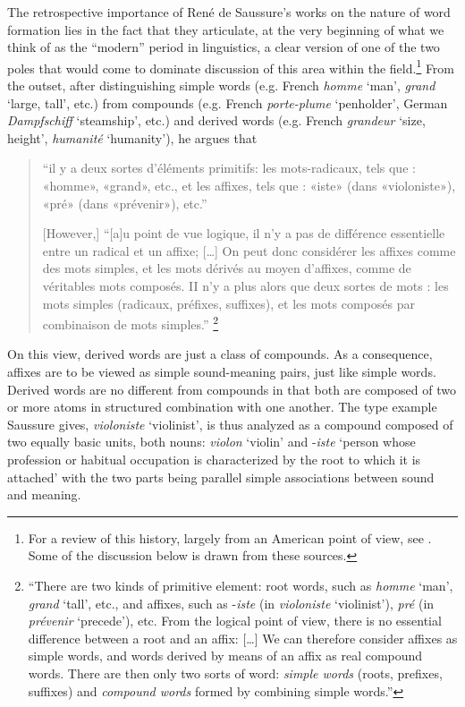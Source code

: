 \documentclass[output=paper]{langsci/langscibook}
\begin{document}
The retrospective importance of Ren\'e de Saussure's works on the
nature of word formation lies in the fact that they articulate, at the
very beginning of what we think of as the ``modern'' period in
linguistics, a clear version of one of the two poles that would come
to dominate discussion of this area within the field.\footnote{For a
  review of this history, largely from an American point of view, see
  \citet{anderson17:matthews,anderson17:ohmt}. Some of the discussion
  below is drawn from these sources.}  From the outset, after
distinguishing simple words (e.g. French \emph{homme} `man',
\emph{grand} `large, tall', etc.)  from compounds (e.g. French
\emph{porte-plume} `penholder', German \emph{Dampfschiff} `steamship',
etc.) and derived words (e.g. French \emph{grandeur} `size, height',
\emph{humanit\'e} `humanity'), he argues that
\begin{quotation}
  ``il y a deux sortes d'\'el\'ements primitifs: les mots-radicaux,
  tels que : «hom\-me», «grand», etc., et les affixes, tels que : «iste»
  (dans «violoniste»), «pr\'e» (dans «pr\'evenir»), etc.''

  {[However,]} ``[a]u point de vue logique, il n’y a pas de
  diff\'erence essentielle entre un radical et un affixe; {[\ldots]}
  On peut donc consid\'erer les affixes comme des mots simples, et les
  mots d\'eriv\'es au moyen d’affixes, comme de v\'eritables mots
  compos\'es. II n’y a plus alors que deux sortes de mots : les mots
  simples (radicaux, pr\'efixes, suffixes), et les mots compos\'es par
  combinaison de mots simples.''
  \footnote{``There are two
    kinds of primitive element: root words, such as \emph{homme}
    ‘man’, \emph{grand} ‘tall’, etc., and affixes, such as
    -\emph{iste} (in \emph{violoniste} ‘violinist’), \emph{pr\'e} (in
    \emph{pr\'evenir} ‘precede’), etc. From the logical point of view,
    there is no essential difference between a root and an affix:
    {[\ldots]} We can therefore consider affixes as simple words, and
    words derived by means of an affix as real compound words. There
    are then only two sorts of word: \emph{simple words} (roots,
    prefixes, suffixes) and \emph{compound words} formed by combining
    simple words.''}
\end{quotation}

On this view, derived words are just a class of compounds.  As a
consequence, affixes are to be viewed as simple sound-meaning pairs,
just like simple words. Derived words are no different from compounds
in that both are composed of two or more atoms in structured
combination with one another.  The type example Saussure gives,
\emph{violoniste} `violinist', is thus analyzed as a compound composed
of two equally basic units, both nouns: \emph{violon} `violin' and
-\emph{iste} `person whose profession or habitual occupation is
characterized by the root to which it is attached' with the two parts
being parallel simple associations between sound and meaning.
\end{document}
